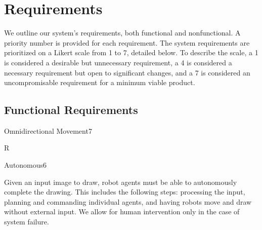 
\section{Requirements}
\label{sec:requirements}
We outline our system's requirements, both functional and nonfunctional. A priority number is provided for each requirement. The system requirements are prioritized on a Likert scale from 1 to 7, detailed below. To describe the scale, a 1 is considered a desirable but unnecessary requirement, a 4 is considered a necessary requirement but open to significant changes, and a 7 is considered an uncompromisable requirement for a minimum viable product.


\subsection{Functional Requirements}
\label{sec:functional_requirements}



\begin{functional_requirement}{Omnidirectional Movement}{7}
\label{fr:omnidirectional}
\item R
\end{functional_requirement}


\begin{functional_requirement}{Autonomous}{6}
\label{fr:autonomous}
\item Given an input image to draw, robot agents must be able to autonomously complete the drawing. This includes the following steps: processing the input, planning and commanding individual agents, and having robots move and draw without external input. We allow for human intervention only in the case of system failure. 
\end{functional_requirement}

